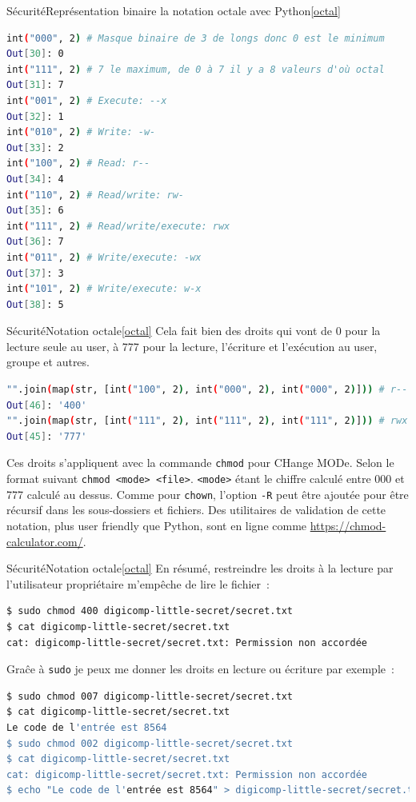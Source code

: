 \documentclass{beamer}
\begin{document}
    \begin{frame}[fragile]{Sécurité}{Représentation binaire la notation octale avec Python\cref{octal}}
        \begin{lstlisting}[language=bash]
int("000", 2) # Masque binaire de 3 de longs donc 0 est le minimum
Out[30]: 0
int("111", 2) # 7 le maximum, de 0 à 7 il y a 8 valeurs d'où octal
Out[31]: 7
int("001", 2) # Execute: --x
Out[32]: 1
int("010", 2) # Write: -w-
Out[33]: 2
int("100", 2) # Read: r--
Out[34]: 4
int("110", 2) # Read/write: rw-
Out[35]: 6
int("111", 2) # Read/write/execute: rwx
Out[36]: 7
int("011", 2) # Write/execute: -wx
Out[37]: 3
int("101", 2) # Write/execute: w-x
Out[38]: 5
        \end{lstlisting}
    \end{frame}

    \begin{frame}[fragile]{Sécurité}{Notation octale\cref{octal}}
        Cela fait bien des droits qui vont de 0 pour la lecture seule au user, à 777 pour la lecture, l'écriture et l'exécution au user, groupe et autres.
        \begin{lstlisting}[language=bash]
"".join(map(str, [int("100", 2), int("000", 2), int("000", 2)])) # r-- pour user
Out[46]: '400'
"".join(map(str, [int("111", 2), int("111", 2), int("111", 2)])) # rwx pour tous
Out[45]: '777'
        \end{lstlisting}
        Ces droits s'appliquent avec la commande \lstinline{chmod} pour CHange MODe.
        Selon le format suivant \lstinline{chmod <mode> <file>}.
        \lstinline{<mode>} étant le chiffre calculé entre 000 et 777 calculé au dessus.
        Comme pour \lstinline{chown}, l'option \lstinline{-R} peut être ajoutée pour être récursif dans les sous-dossiers et fichiers.
        \bigbreak
        Des utilitaires de validation de cette notation, plus user friendly que Python, sont en ligne comme \url{https://chmod-calculator.com/}.
    \end{frame}

    \begin{frame}[fragile]{Sécurité}{Notation octale\cref{octal}}
        En résumé, restreindre les droits à la lecture par l'utilisateur propriétaire m'empêche de lire le fichier~:
        \begin{lstlisting}[language=bash]
$ sudo chmod 400 digicomp-little-secret/secret.txt
$ cat digicomp-little-secret/secret.txt
cat: digicomp-little-secret/secret.txt: Permission non accordée
        \end{lstlisting}
        Graĉe à \lstinline{sudo} je peux me donner les droits en lecture ou écriture par exemple~:
        \begin{lstlisting}[language=bash]
$ sudo chmod 007 digicomp-little-secret/secret.txt
$ cat digicomp-little-secret/secret.txt
Le code de l'entrée est 8564
$ sudo chmod 002 digicomp-little-secret/secret.txt
$ cat digicomp-little-secret/secret.txt
cat: digicomp-little-secret/secret.txt: Permission non accordée
$ echo "Le code de l'entrée est 8564" > digicomp-little-secret/secret.txt
        \end{lstlisting}
    \end{frame}
\end{document}
